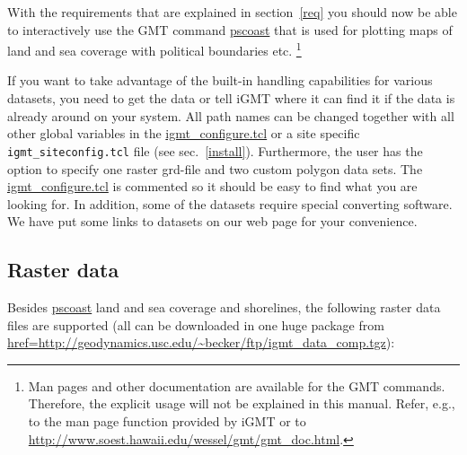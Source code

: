\documentclass[11pt]{article}
\begin{document}
With the requirements that are explained in section~\ref{req} you
should now be able to interactively use the GMT command \url{pscoast}
that is used for plotting maps of land and sea coverage with political
boundaries etc. \footnote{Man pages and other documentation are
  available for the GMT commands. Therefore, the explicit usage will
  not be explained in this manual. Refer, e.g., to the man page
  function provided by iGMT or to \url{http://www.soest.hawaii.edu/wessel/gmt/gmt_doc.html}.}

If you want to take advantage of the built-in handling capabilities
for various datasets, you need to get the data or tell iGMT where it
can find it if the data is already around on your system. All path
names can be changed together with all other global variables in the
\url{igmt_configure.tcl} or a site specific {\tt
  igmt\_siteconfig.tcl} file (see sec.~\ref{install}).  Furthermore,
the user has the option to specify one raster grd-file and two custom
polygon data sets.  The \url{igmt_configure.tcl} is commented so it
should be easy to find what you are looking for. In addition, some of
the datasets require special converting software. We have put some
links to datasets on our web page for your convenience.




\subsection{Raster data}

Besides \url{pscoast} land and sea coverage and shorelines, 
the following raster data files are supported (all can be downloaded
in one huge package from
\url{href=http://geodynamics.usc.edu/~becker/ftp/igmt_data_comp.tgz}):
\end{document}
